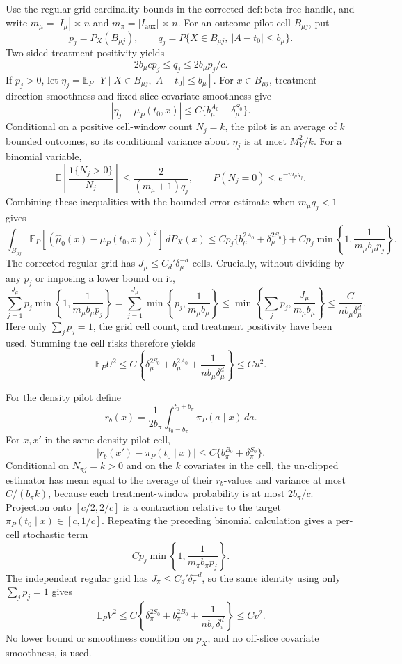Use the regular-grid cardinality bounds in the corrected \(\mathrm{def:beta\text{-}free\text{-}handle}\), and write \(m_\mu=|I_\mu|\asymp n\) and \(m_\pi=|I_{\mathrm{aux}}|\asymp n\). For an outcome-pilot cell \(B_{\mu j}\), put
\[
p_j=P_X(B_{\mu j}),
\qquad
q_j=P\{X\in B_{\mu j},\ |A-t_0|\le b_\mu\}.
\]
Two-sided treatment positivity yields
\[
2b_\mu c p_j\le q_j\le 2b_\mu p_j/c.
\]
If \(p_j>0\), let \(\eta_j=\mathbb E_P[Y\mid X\in B_{\mu j},|A-t_0|\le b_\mu]\). For \(x\in B_{\mu j}\), treatment-direction smoothness and fixed-slice covariate smoothness give
\[
|\eta_j-\mu_P(t_0,x)|
\le C\{b_\mu^{A_0}+\delta_\mu^{S_0}\}.
\]
Conditional on a positive cell-window count \(N_j=k\), the pilot is an average of \(k\) bounded outcomes, so its conditional variance about \(\eta_j\) is at most \(M_Y^2/k\). For a binomial variable,
\[
\mathbb E\!\left[\frac{\mathbf1\{N_j>0\}}{N_j}\right]
\le\frac{2}{(m_\mu+1)q_j},
\qquad
P(N_j=0)\le e^{-m_\mu q_j}.
\]
Combining these inequalities with the bounded-error estimate when \(m_\mu q_j<1\) gives
\[
\int_{B_{\mu j}}\mathbb E_P[(\widehat\mu_0(x)-\mu_P(t_0,x))^2]\,dP_X(x)
\le
Cp_j\{b_\mu^{2A_0}+\delta_\mu^{2S_0}\}
+Cp_j\min\!\left\{1,\frac1{m_\mu b_\mu p_j}\right\}.
\]
The corrected regular grid has \(J_\mu\le C_d'\delta_\mu^{-d}\) cells. Crucially, without dividing by any \(p_j\) or imposing a lower bound on it,
\[
\sum_{j=1}^{J_\mu}p_j\min\!\left\{1,\frac1{m_\mu b_\mu p_j}\right\}
=
\sum_{j=1}^{J_\mu}\min\!\left\{p_j,\frac1{m_\mu b_\mu}\right\}
\le
\min\!\left\{\sum_jp_j,\frac{J_\mu}{m_\mu b_\mu}\right\}
\le\frac{C}{nb_\mu\delta_\mu^d}.
\]
Here only \(\sum_jp_j=1\), the grid cell count, and treatment positivity have been used. Summing the cell risks therefore yields
\[
\mathbb E_PU^2
\le C\left\{
\delta_\mu^{2S_0}+b_\mu^{2A_0}+\frac1{nb_\mu\delta_\mu^d}
\right\}
\le Cu^2.
\]

For the density pilot define
\[
r_b(x)=\frac1{2b_\pi}
\int_{t_0-b_\pi}^{t_0+b_\pi}\pi_P(a\mid x)\,da.
\]
For \(x,x'\) in the same density-pilot cell,
\[
|r_b(x')-\pi_P(t_0\mid x)|
\le C\{b_\pi^{B_0}+\delta_\pi^{S_0}\}.
\]
Conditional on \(N_{\pi j}=k>0\) and on the \(k\) covariates in the cell, the un-clipped estimator has mean equal to the average of their \(r_b\)-values and variance at most \(C/(b_\pi k)\), because each treatment-window probability is at most \(2b_\pi/c\). Projection onto \([c/2,2/c]\) is a contraction relative to the target \(\pi_P(t_0\mid x)\in[c,1/c]\). Repeating the preceding binomial calculation gives a per-cell stochastic term
\[
Cp_j\min\!\left\{1,\frac1{m_\pi b_\pi p_j}\right\}.
\]
The independent regular grid has \(J_\pi\le C_d'\delta_\pi^{-d}\), so the same identity using only \(\sum_jp_j=1\) gives
\[
\mathbb E_PV^2
\le C\left\{
\delta_\pi^{2S_0}+b_\pi^{2B_0}+\frac1{nb_\pi\delta_\pi^d}
\right\}
\le Cv^2.
\]
No lower bound or smoothness condition on \(p_X\), and no off-slice covariate smoothness, is used.